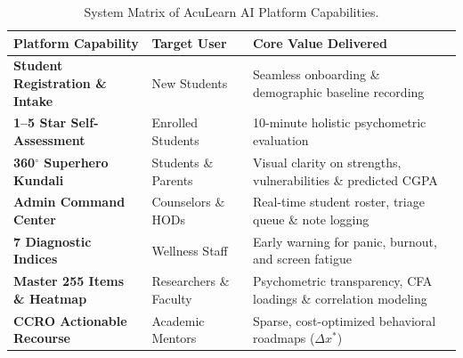 \documentclass[11pt,a4paper]{article}
\begin{document}
\begin{table}[H]
\centering
\small
\begin{tabular}{p{4.5cm} p{4cm} p{6.5cm}}
\toprule
\textbf{Platform Capability} & \textbf{Target User} & \textbf{Core Value Delivered} \\
\midrule
\textbf{Student Registration \& Intake} & New Students & Seamless onboarding \& demographic baseline recording \\
\textbf{1--5 Star Self-Assessment} & Enrolled Students & 10-minute holistic psychometric evaluation \\
\textbf{360$^\circ$ Superhero Kundali} & Students \& Parents & Visual clarity on strengths, vulnerabilities \& predicted CGPA \\
\textbf{Admin Command Center} & Counselors \& HODs & Real-time student roster, triage queue \& note logging \\
\textbf{7 Diagnostic Indices} & Wellness Staff & Early warning for panic, burnout, and screen fatigue \\
\textbf{Master 255 Items \& Heatmap} & Researchers \& Faculty & Psychometric transparency, CFA loadings \& correlation modeling \\
\textbf{CCRO Actionable Recourse} & Academic Mentors & Sparse, cost-optimized behavioral roadmaps ($\Delta x^*$) \\
\bottomrule
\end{tabular}
\caption{System Matrix of AcuLearn AI Platform Capabilities.}
\end{table}
\end{document}
